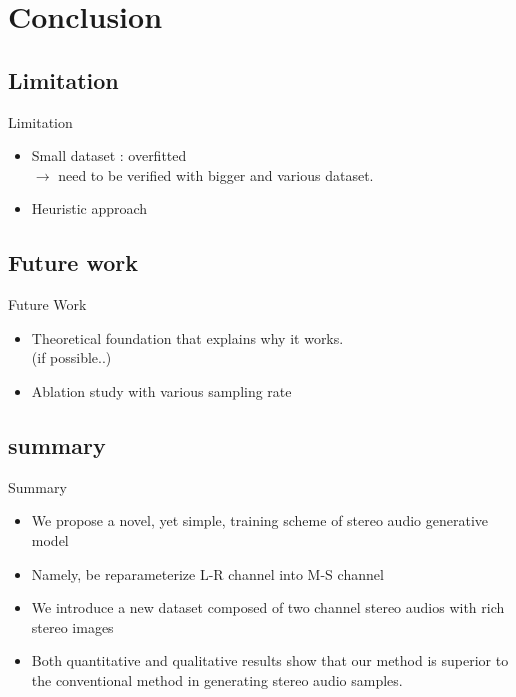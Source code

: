 \section{Conclusion}

\begin{frame}{}
  \subsection{Limitation}
  \begin{block}{Limitation}
    \begin{itemize}
        \item Small dataset : overfitted\\
        $\rightarrow$ need to be verified with bigger and various dataset.
        \item Heuristic approach
    \end{itemize}
  \end{block}
  \bigskip
  \subsection{Future work}
  \begin{block}{Future Work}
    \begin{itemize}
        \item Theoretical foundation that explains why it works.\\
        (if possible..)
        \item Ablation study with various sampling rate
    \end{itemize}
  \end{block}
\end{frame}

\subsection{summary}
\begin{frame}{Summary}
    \begin{itemize}
        \item We propose a novel, yet simple, training scheme of stereo audio generative model
        \item Namely, be reparameterize L-R channel into M-S channel
        \item We introduce a new dataset composed of two channel stereo audios with rich stereo images
        \item Both quantitative and qualitative results show that our method is superior to the conventional method in generating stereo audio samples.
    \end{itemize}
\end{frame}